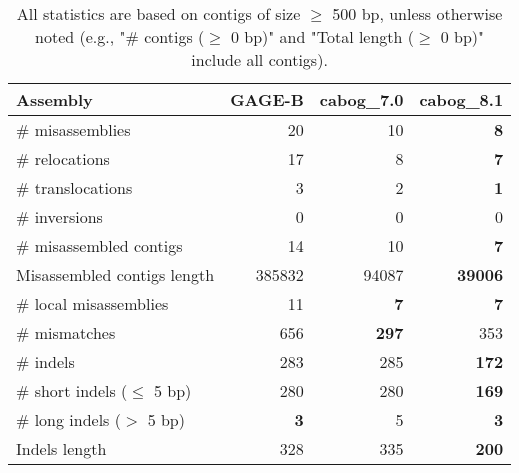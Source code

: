 \documentclass[12pt,a4paper]{article}
\begin{document}
\begin{table}[ht]
\begin{center}
\caption{All statistics are based on contigs of size $\geq$ 500 bp, unless otherwise noted (e.g., "\# contigs ($\geq$ 0 bp)" and "Total length ($\geq$ 0 bp)" include all contigs).}
\begin{tabular}{|l*{3}{|r}|}
\hline
Assembly & GAGE-B & cabog\_7.0 & cabog\_8.1 \\ \hline
\# misassemblies & 20 & 10 & {\bf 8} \\ \hline
\hspace{5mm}\# relocations & 17 & 8 & {\bf 7} \\ \hline
\hspace{5mm}\# translocations & 3 & 2 & {\bf 1} \\ \hline
\hspace{5mm}\# inversions & 0 & 0 & 0 \\ \hline
\# misassembled contigs & 14 & 10 & {\bf 7} \\ \hline
Misassembled contigs length & 385832 & 94087 & {\bf 39006} \\ \hline
\# local misassemblies & 11 & {\bf 7} & {\bf 7} \\ \hline
\# mismatches & 656 & {\bf 297} & 353 \\ \hline
\# indels & 283 & 285 & {\bf 172} \\ \hline
\hspace{5mm}\# short indels ($\leq$ 5 bp) & 280 & 280 & {\bf 169} \\ \hline
\hspace{5mm}\# long indels ($>$ 5 bp) & {\bf 3} & 5 & {\bf 3} \\ \hline
Indels length & 328 & 335 & {\bf 200} \\ \hline
\end{tabular}
\end{center}
\end{table}
\end{document}
